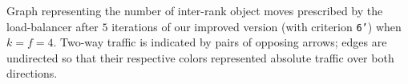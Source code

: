 Graph representing the number of inter-rank object moves prescribed by the load-balancer
after  $5$ iterations of our improved version (with criterion \texttt{6'}) when $k=f=4$.
Two-way traffic is indicated by pairs of opposing arrows; edges are undirected so that
their respective colors represented absolute traffic over both directions.
